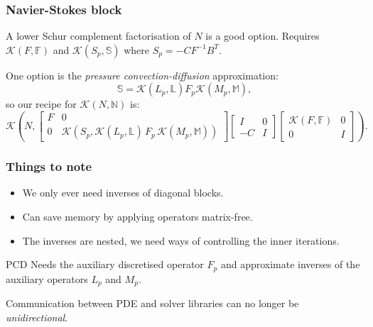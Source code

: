 \documentclass[presentation]{beamer}
\newcommand{\KSP}[2]{\ensuremath{\mathcal{K}\left(#1, \mathbb{#2}\right)}}
\newcommand{\ksp}[1]{\KSP{#1}{#1}}
\begin{document}
\begin{frame}
  \frametitle{Navier-Stokes block \parencite{Elman:2014}}
  A lower Schur complement factorisation of $N$ is a good option.
  Requires $\ksp{F}$ and $\KSP{S_p}{S}$ where $S_p = -C F^{-1} B^T$.

  One option is the \emph{pressure convection-diffusion}
  approximation:
  \begin{equation*}
    \mathbb{S} = \KSP{L_p}{L} F_p \KSP{M_p}{M},
  \end{equation*}
  so our recipe for $\ksp{N}$ is:
  \begin{equation*}
    \mathcal{K}\left(N, \begin{bmatrix}
      F & 0 \\
      0 & \mathcal{K}(S_p, \KSP{L_p}{L}\,F_p \, \KSP{M_p}{M})
    \end{bmatrix}
    \begin{bmatrix}
      I & 0\\
      -C & I
    \end{bmatrix}
    \begin{bmatrix}
      \ksp{F} & 0 \\
      0 & I
    \end{bmatrix}\right).
  \end{equation*}

\end{frame}

\begin{frame}
  \frametitle{Things to note}

  \begin{itemize}
  \item We only ever need inverses of diagonal blocks.
  \item Can save memory by applying operators matrix-free.
  \item The inverses are nested, we need ways of controlling the inner
    iterations.
  \end{itemize}

  \begin{block}{PCD}
    Needs the auxiliary discretised operator $F_p$ and approximate
    inverses of the auxiliary operators $L_p$ and $M_p$.

    Communication between PDE and solver libraries can no longer be
    \emph{unidirectional}.
  \end{block}
\end{frame}
\end{document}
